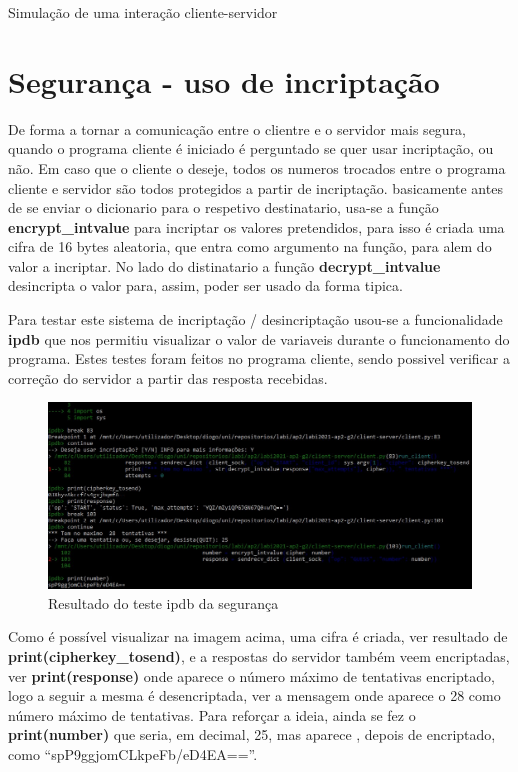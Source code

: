 \documentclass{report}
\newenvironment{changemargin}[2]{%
\begin{list}{}{%
\setlength{\topsep}{0pt}%
\setlength{\leftmargin}{#1}%
\setlength{\rightmargin}{#2}%
\setlength{\listparindent}{\parindent}%
\setlength{\itemindent}{\parindent}%
\setlength{\parsep}{\parskip}%
}%
\item[]}{\end{list}}
\theoremstyle{remark}
\begin{document}
{\begin{section}{Simulação de uma interação cliente-servidor}
\end{section}
\section{Segurança - uso de incriptação}
\label{sec.segurança}

De forma a tornar a comunicação entre o clientre e o servidor mais segura, quando o programa cliente é iniciado é perguntado se quer usar incriptação, ou não. Em caso que o cliente o deseje, todos os numeros trocados entre o programa cliente e servidor são todos protegidos a partir de incriptação. basicamente antes de se enviar o dicionario para o respetivo destinatario, usa-se a função \textbf{encrypt\_intvalue} para incriptar os valores pretendidos, para isso é criada uma cifra de 16 bytes aleatoria, que entra como argumento na função, para alem do valor a incriptar. No lado do distinatario a função  \textbf{decrypt\_intvalue} desincripta o valor para, assim, poder ser usado da forma tipica.

Para testar este sistema de incriptação / desincriptação usou-se a funcionalidade  \textbf{\ac{ipdb}} que nos permitiu visualizar o valor de variaveis durante o funcionamento do programa. Estes testes foram feitos no programa cliente, sendo possivel verificar a correção do servidor a partir das resposta recebidas.

\begin{figure}[H]
\begin{changemargin}{-3.5cm}{-3.5cm}
\center
\includegraphics[width = 15 cm ]{incriptacao.jpg}
\caption{Resultado do teste ipdb da segurança}
\end{changemargin}
\end{figure}

Como é possível visualizar na imagem acima, uma cifra é criada, ver resultado de \textbf{print(cipherkey\_tosend)}, e a respostas do servidor também veem encriptadas, ver \textbf{print(response)} onde aparece o número máximo de tentativas encriptado, logo a seguir a mesma é desencriptada, ver a mensagem onde aparece o 28 como número máximo de tentativas. Para reforçar a ideia, ainda se fez o \textbf{print(number)} que seria, em decimal, 25, mas aparece , depois de encriptado, como ``spP9ggjomCLkpeFb/eD4EA==''.

}
\end{document}
